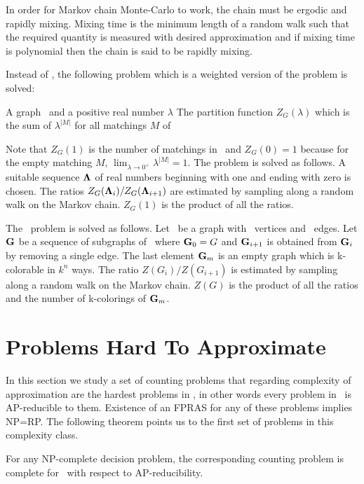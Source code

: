 In order for Markov chain Monte-Carlo to work, the chain must be ergodic and rapidly mixing.
Mixing time is the minimum length of a random walk such that the required
quantity is measured with desired approximation and if mixing
time is polynomial then the chain is said to be rapidly mixing.

Instead of , the following problem which is a weighted version of
the  problem is solved:

{A graph \mG\ and a positive real number \(\lambda\)}
{The partition function \(Z_G(\lambda)\) which is the sum of
\(\lambda^{|M|}\) for all matchings \(M\) of \mG}

Note that \(Z_G(1)\) is the number of matchings in \mG\ and \(Z_G(0)=1\) because
for the empty matching \(M\), \(\lim_{\lambda\to 0^+}\lambda^{|M|}=1\).
The  problem is solved as follows.
A suitable sequence \(\mathbf{\Lambda}\) of real numbers beginning with one and ending
with zero is chosen. The ratios \(Z_G(\mathbf{\Lambda}_i)/Z_G(\mathbf{\Lambda}_{i+1})\) are estimated 
by sampling along a random walk on the Markov chain. \(Z_G(1)\) is the product of
all the ratios.

The \ldkcol\ problem is solved as follows. Let \mG\ be a graph with \mn\ vertices
and \mm\ edges. Let \(\mathbf{G}\) be a sequence of subgraphs of \mG\ where
\(\mathbf{G}_0=G\) and \(\mathbf{G}_{i+1}\) is obtained from \(\mathbf{G}_i\) by removing a single edge. 
The last element \(\mathbf{G}_m\) is an empty graph which is k-colorable in \(k^n\) ways.
The ratio \(Z(G_i)/Z(G_{i+1})\) is estimated
by sampling along a random walk on the Markov chain. \(Z(G)\) is the product of all the
ratios and the number of k-colorings of \(\mathbf{G}_m\).


\section{Problems Hard To Approximate} \label{sec:hard}
In this section we study a set of counting problems that regarding complexity
of approximation are the hardest problems in \cp, in other words every
problem in \cp\ is AP-reducible to them.
Existence of an FPRAS for any of these problems implies NP=RP\@. The following theorem 
points us to the first set of problems in this complexity class.

\begin{theorem} \label{theorem:trichotomy}
For any NP-complete decision problem, the corresponding counting problem is complete
for \cp\ with respect to AP-reducibility.
\end{theorem}

